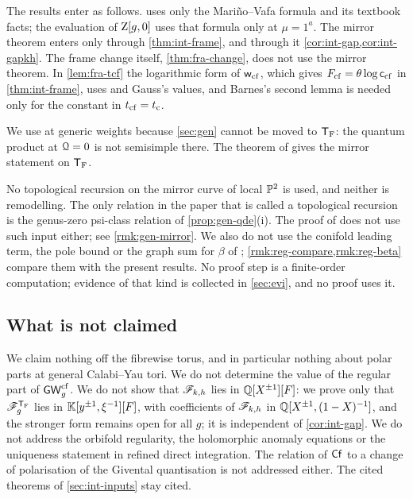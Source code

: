 The results enter as follows.  uses only the Mari\~no--Vafa formula and its textbook facts; the evaluation of $\mathrm{Z}[g,0]$ uses that formula only at $\mu=1^a$. The mirror theorem enters only through \cref{thm:int-frame}, and through it \cref{cor:int-gap,cor:int-gapkh}. The frame change itself, \cref{thm:fra-change}, does not use the mirror theorem. In \cref{lem:fra-tcf} the logarithmic form of $\mathsf{w}_{\mathrm{cf}}$, which gives $F_{\mathrm{cf}}=\theta\log\mathsf{c}_{\mathrm{cf}}$ in \cref{thm:int-frame}, uses \cite[Eq.~15.6.7]{DLMF} and Gauss's values, and Barnes's second lemma is needed only for the constant in $t_{\mathrm{cf}}=t_{\mathrm{c}}$.

We use \cite[Theorem~31]{CCIT15} at generic weights because \cref{sec:gen} cannot be moved to $\mathsf{T}_{\mathrm{F}}$: the quantum product at $\mathcal{Q}=0$ is not semisimple there. The theorem of \cite{Coa09} gives the mirror statement on $\mathsf{T}_{\mathrm{F}}$.

No topological recursion on the mirror curve of local $\mathbb{P}^2$ is used, and neither is remodelling. The only relation in the paper that is called a topological recursion is the genus-zero psi-class relation of \cref{prop:gen-qde}(i). The proof of \cite[Theorem~31]{CCIT15} does not use such input either; see \cref{rmk:gen-mirror}. We also do not use the conifold leading term, the pole bound or the graph sum for $\beta$ of \cite{BS}; \cref{rmk:reg-compare,rmk:reg-beta} compare them with the present results.  No proof step is a finite-order computation; evidence of that kind is collected in \cref{sec:evi}, and no proof uses it.

\subsection{What is not claimed}
\label{sec:int-notclaimed}

We claim nothing off the fibrewise torus, and in particular nothing about polar parts at general Calabi--Yau tori. We do not determine the value of the regular part of $\mathsf{GW}^{\mathrm{cf}}_g$. We do not show that $\mathscr{F}_{k,h}$ lies in $\mathbb{Q}[X^{\pm1}][F]$: we prove only that $\mathscr{F}_g^{\mathsf{T}_{\mathrm{F}}}$ lies in $\mathbb{K}[y^{\pm1},\xi^{-1}][F]$, with coefficients of $\mathscr{F}_{k,h}$ in $\mathbb{Q}[X^{\pm1},(1-X)^{-1}]$, and the stronger form remains open for all $g$; it is independent of \cref{cor:int-gap}. We do not address the orbifold regularity, the holomorphic anomaly equations or the uniqueness statement in refined direct integration. The relation of $\mathsf{Cf}$ to a change of polarisation of the Givental quantisation is not addressed either. The cited theorems of \cref{sec:int-inputs} stay cited.

